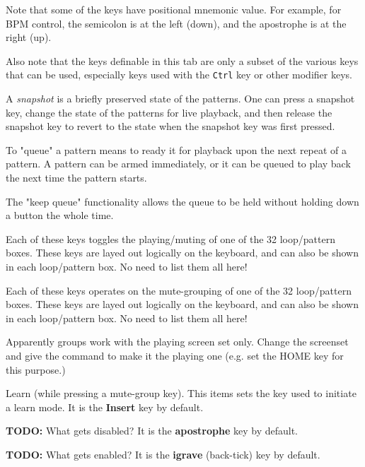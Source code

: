    Note that some of the keys have positional mnemonic value.  For example,
   for BPM control, the semicolon is at the left (down), and the apostrophe
   is at the right (up).

   Also note that the keys definable in this tab are only a subset of the
   various keys that can be used, especially keys used with the
   \texttt{Ctrl} key or other modifier keys.

   A \textsl{snapshot} is a briefly preserved state of the patterns.
   One can press a snapshot key, change the state of the patterns for live
   playback, and then release the snapshot key to revert to the state when
   the snapshot key was first pressed.

   To "queue" a pattern means to ready it for playback upon the next repeat
   of a pattern.  A pattern can be armed immediately, or it can be queued to
   play back the next time the pattern starts.

   The "keep queue" functionality allows the queue to be held without
   holding down a button the whole time.

   Each of these keys toggles the playing/muting of one of the 32
   loop/pattern boxes.  These keys are layed out logically on the keyboard,
   and can also be shown in each loop/pattern box.  No need to list them all
   here!

   Each of these keys operates on the mute-grouping of one of the 32
   loop/pattern boxes.  These keys are layed out logically on the keyboard,
   and can also be shown in each loop/pattern box.  No need to list them all
   here!

   Apparently groups work with the playing screen set only.
   Change the screenset and give the command to make it the playing one
   (e.g. set the HOME key for this purpose.)

   Learn (while pressing a mute-group key).
   This items sets the key used to initiate a learn mode.
   It is the \textbf{Insert} key by default.

   \textbf{TODO:}  What gets disabled?
   It is the \textbf{apostrophe} key by default.

   \textbf{TODO:} What gets enabled?
   It is the \textbf{igrave} (back-tick) key by default.

